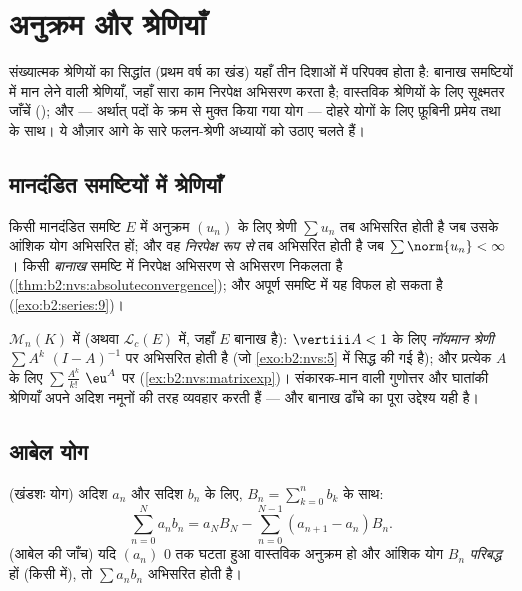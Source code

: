 \chapter{अनुक्रम और श्रेणियाँ}\label{ch:b2:series}

संख्यात्मक श्रेणियों का सिद्धांत (प्रथम वर्ष का खंड) यहाँ तीन दिशाओं में
परिपक्व होता है: बानाख समष्टियों में मान लेने वाली श्रेणियाँ, जहाँ सारा
काम निरपेक्ष अभिसरण करता है; वास्तविक श्रेणियों के लिए सूक्ष्मतर जाँचें
(); और \emph{} --- अर्थात् पदों के क्रम से मुक्त किया
गया योग --- दोहरे योगों के लिए फ़ूबिनी प्रमेय तथा  के साथ। ये
औज़ार आगे के सारे फलन-श्रेणी अध्यायों को उठाए चलते हैं।

\section{मानदंडित समष्टियों में श्रेणियाँ}

\begin{definition}\label{def:b2:series:def}
किसी मानदंडित समष्टि $E$ में अनुक्रम $(u_n)$ के लिए श्रेणी $\sum u_n$ तब अभिसरित
होती है जब उसके आंशिक योग अभिसरित हों; और वह \emph{निरपेक्ष रूप
से} तब अभिसरित होती है जब $\sum \norm{u_n} < \infty$।
किसी \emph{बानाख} समष्टि में निरपेक्ष अभिसरण से अभिसरण निकलता है (\cref{thm:b2:nvs:absoluteconvergence});
और अपूर्ण समष्टि में यह विफल हो सकता है (\cref{exo:b2:series:9})।
\end{definition}

\begin{example}\label{ex:b2:series:neumann}
$\mathcal{M}_n(K)$ में (अथवा $\mathcal{L}_c(E)$ में, जहाँ $E$ बानाख है): $\vertiii A < 1$ के लिए \emph{नॉयमान
श्रेणी} $\sum A^k$  $(I - A)^{-1}$ पर अभिसरित होती है (जो \cref{exo:b2:nvs:5} में सिद्ध की
गई है); और प्रत्येक $A$ के लिए $\sum \frac{A^k}{k!}$  $\eu^A$ पर (\cref{ex:b2:nvs:matrixexp})।
संकारक-मान वाली गुणोत्तर और घातांकी श्रेणियाँ अपने अदिश नमूनों की तरह
व्यवहार करती हैं --- और बानाख ढाँचे का पूरा उद्देश्य यही है।
\end{example}

\section{आबेल योग}

\begin{theorem}[आबेल का योग और उसकी जाँच]\label{thm:b2:series:abel}
(खंडशः योग) अदिश $a_n$ और सदिश $b_n$ के लिए, $B_n
= \sum_{k=0}^{n} b_k$ के साथ:
\[
\sum_{n=0}^{N} a_n b_n
= a_N B_N - \sum_{n=0}^{N-1} (a_{n+1} - a_n) B_n .
\]
(आबेल की जाँच) यदि $(a_n)$ $0$ तक घटता हुआ वास्तविक अनुक्रम हो और आंशिक योग
$B_n$ \emph{परिबद्ध} हों (किसी  में), तो $\sum a_n b_n$ अभिसरित होती है।
\end{theorem}

